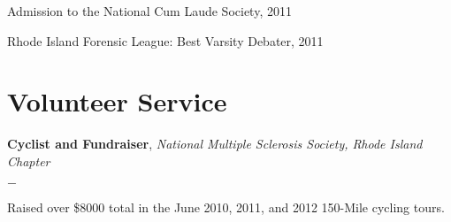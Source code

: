 \documentclass[margin,line]{res}
\newenvironment{list1}{
  \begin{list}{\ding{113}}{%
      \setlength{\itemsep}{0in}
      \setlength{\parsep}{0in} \setlength{\parskip}{0in}
      \setlength{\topsep}{0in} \setlength{\partopsep}{0in} 
      \setlength{\leftmargin}{0.17in}}}{\end{list}}
\newenvironment{list2}{
  \begin{list}{$-$}{%
      \setlength{\itemsep}{0in}
      \setlength{\parsep}{0in} \setlength{\parskip}{0in}
      \setlength{\topsep}{0in} \setlength{\partopsep}{0in} 
      \setlength{\leftmargin}{0.2in}}}{\end{list}}
\begin{document}
\begin{resume}
Admission to the National Cum Laude Society, 2011 
\vspace*{-.15in}

Rhode Island Forensic League: Best Varsity Debater, 2011





%





\section{\sc Volunteer Service}
{\bf Cyclist and Fundraiser}, {\em National Multiple Sclerosis Society, Rhode Island Chapter}
\begin{list2}
\item Raised over \$8000 total in the June 2010, 2011, and 2012 150-Mile cycling tours.
\end{list2}


\end{resume}
\end{document}
